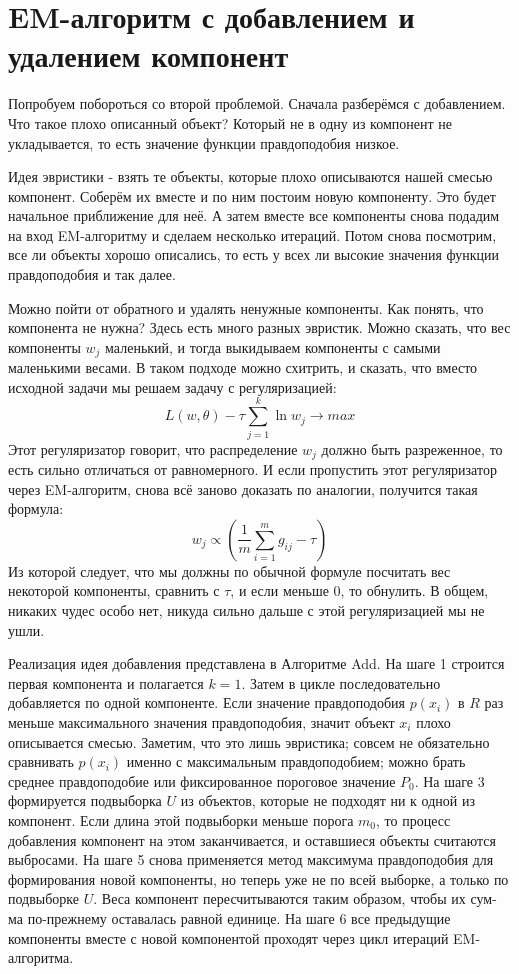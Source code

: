 \section*{EM-алгоритм с добавлением и удалением компонент}

Попробуем побороться со второй проблемой. Сначала разберёмся с добавлением.
Что такое плохо описанный объект? Который не в одну из компонент не укладывается, то есть значение функции правдоподобия низкое.

Идея эвристики - взять те объекты, которые плохо описываются нашей смесью компонент. Соберём их вместе и по ним постоим новую компоненту. Это будет начальное приближение для неё. А затем вместе все компоненты снова подадим на вход EM-алгоритму и сделаем несколько итераций. Потом снова посмотрим, все ли объекты хорошо описались, то есть у всех ли высокие значения функции правдоподобия и так далее.

Можно пойти от обратного и удалять ненужные компоненты. Как понять, что компонента не нужна? Здесь есть много разных эвристик. Можно сказать, что вес компоненты $w_j$ маленький, и тогда выкидываем компоненты с самыми маленькими весами. В таком подходе можно схитрить, и сказать, что вместо исходной задачи мы решаем задачу с регуляризацией:
$$L(w, \theta) - \tau\sum\limits_{j=1}^k\ln{w_j} \rightarrow max$$
Этот регуляризатор говорит, что распределение $w_j$ должно быть разреженное, то есть сильно отличаться от равномерного. И если пропустить этот регуляризатор через EM-алгоритм, снова всё заново доказать по аналогии, получится такая формула:
$$w_j \propto \left(\frac{1}{m}\sum\limits_{i = 1}^m g_{ij} - \tau\right)$$
Из которой следует, что мы должны по обычной формуле посчитать вес некоторой компоненты, сравнить с $\tau$, и если меньше $0$, то обнулить. В общем, никаких чудес особо нет, никуда сильно дальше с этой регуляризацией мы не ушли.

Реализация идея добавления представлена в Алгоритме Add. На шаге 1 строится первая компонента и полагается $k = 1$. Затем в цикле последовательно добавляется по одной компоненте. Если значение правдоподобия $p(x_i)$ в $R$ раз меньше максимального значения правдоподобия, значит объект $x_i$ плохо описывается смесью. Заметим, что это лишь эвристика; совсем не обязательно сравнивать $p(x_i)$ именно с максимальным правдоподобием; можно брать среднее правдоподобие или фиксированное пороговое значение $P_0$. На шаге 3 формируется подвыборка $U$ из объектов, которые не подходят ни к одной из компонент. Если длина этой подвыборки меньше порога $m_0$, то процесс добавления компонент на этом заканчивается, и оставшиеся объекты считаются выбросами. На шаге 5 снова применяется метод максимума правдоподобия для формирования новой компоненты, но теперь уже не по всей выборке, а только по подвыборке $U$. Веса компонент пересчитываются таким образом, чтобы их сум-
ма по-прежнему оставалась равной единице. На шаге 6 все предыдущие компоненты
вместе с новой компонентой проходят через цикл итераций EM-алгоритма.


